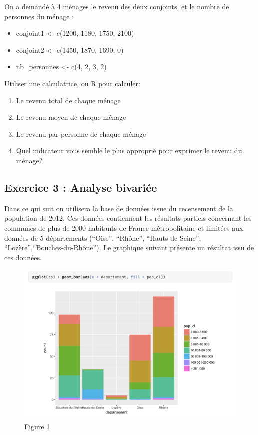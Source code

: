 \documentclass[]{article}
\begin{document}
On a demandé à 4 ménages le revenu des deux conjoints, et le nombre de
personnes du ménage :

\begin{itemize}
\item
  conjoint1 \textless{}- c(1200, 1180, 1750, 2100)
\item
  conjoint2 \textless{}- c(1450, 1870, 1690, 0)
\item
  nb\_personnes \textless{}- c(4, 2, 3, 2)
\end{itemize}

Utiliser une calculatrice, ou R pour calculer:

\begin{enumerate}
\def\labelenumi{\arabic{enumi}.}
\item
  Le revenu total de chaque ménage
\item
  Le revenu moyen de chaque ménage
\item
  Le revenu par personne de chaque ménage
\item
  Quel indicateur vous semble le plus approprié pour exprimer le revenu
  du ménage?
\end{enumerate}

\subsection{Exercice 3 : Analyse
bivariée}\label{exercice-3-analyse-bivariee}

Dans ce qui suit on utilisera la base de données issue du recensement de
la population de 2012. Ces données contiennent les résultats partiels
concernant les communes de plus de 2000 habitants de France
métropolitaine et limitées aux données de 5 départements (``Oise'',
``Rhône'', ``Hauts-de-Seine'', ``Lozère'',``Bouches-du-Rhône''). Le
graphique suivant présente un résultat issu de ces données.

\begin{figure}
\includegraphics[width=1\linewidth]{Graphique1} \caption{Figure 1}\label{fig:pressure}
\end{figure}
\end{document}
